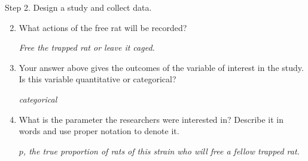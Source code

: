 {\sf Step 2. Design a study and collect data.}\vspace{-.1in}
\begin{enumerate}
  \setcounter{enumi}{1}
  \item \label{RatOptions} What actions of the free rat will be recorded? 
\begin{students}
  \vspace{1cm}
\end{students}

\begin{key}
{\it Free the trapped rat or leave it caged.}
\end{key}

  \item Your answer above gives the outcomes of the  variable of interest in the study.  Is this variable quantitative or categorical?
\begin{students}
  \vspace{1cm}
\end{students}

\begin{key}
{\it  categorical}
\end{key}

  \item  What is the parameter the researchers were interested in?
    Describe it in words and use proper notation to denote it. 
\begin{students}
  \vspace{1cm}
\end{students}

\begin{key}
{\it  $p$, the true proportion of rats of this strain who will free
  a fellow trapped rat.}
\end{key}
\end{enumerate}


